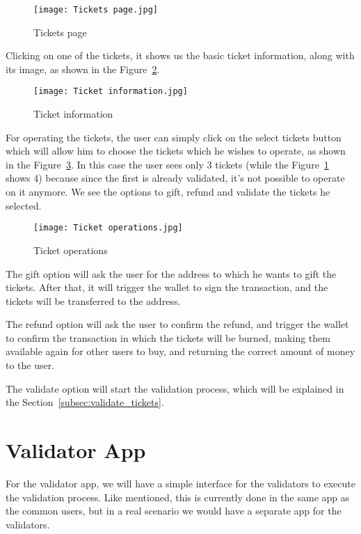 \begin{figure}[H]
	\texttt{[image: Tickets page.jpg]}
	\centering
	\caption{Tickets page}\label{fig:tickets_page}
\end{figure}

Clicking on one of the tickets, it shows us the basic ticket information, along
with its image, as shown in the Figure~\ref{fig:ticket_information}.

\begin{figure}[H]
	\texttt{[image: Ticket information.jpg]}
	\centering
	\caption{Ticket information}\label{fig:ticket_information}
\end{figure}

For operating the tickets, the user can simply click on the select tickets
button which will allow him to choose the tickets which he wishes to operate,
as shown in the Figure~\ref{fig:ticket_operations}. In this case the user sees
only 3 tickets (while the Figure~\ref{fig:tickets_page} shows 4) because since
the first is already validated, it's not possible to operate on it anymore. We
see the options to gift, refund and validate the tickets he selected.

\begin{figure}[H]
	\texttt{[image: Ticket operations.jpg]}
	\centering
	\caption{Ticket operations}\label{fig:ticket_operations}
\end{figure}

The gift option will ask the user for the address to which he wants to gift the
tickets. After that, it will trigger the wallet to sign the transaction, and
the tickets will be transferred to the address.

The refund option will ask the user to confirm the refund, and trigger the
wallet to confirm the transaction in which the tickets will be burned, making
them available again for other users to buy, and returning the correct amount
of money to the user.

The validate option will start the validation process, which will be explained
in the Section~\ref{subsec:validate_tickets}.

\section{Validator App}\label{sec:validator_app}

For the validator app, we will have a simple interface for the validators to
execute the validation process. Like mentioned, this is currently done in the
same app as the common users, but in a real scenario we would have a separate
app for the validators.

